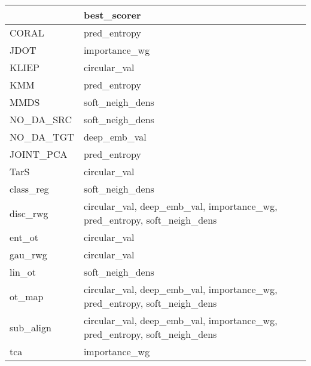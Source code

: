 \begin{tabular}{ll}
\hline
           & best\_scorer                                                              \\
\hline
 CORAL     & pred\_entropy                                                             \\
 JDOT      & importance\_wg                                                            \\
 KLIEP     & circular\_val                                                             \\
 KMM       & pred\_entropy                                                             \\
 MMDS      & soft\_neigh\_dens                                                          \\
 NO\_DA\_SRC & soft\_neigh\_dens                                                          \\
 NO\_DA\_TGT & deep\_emb\_val                                                             \\
 JOINT\_PCA & pred\_entropy                                                             \\
 TarS      & circular\_val                                                             \\
 class\_reg & soft\_neigh\_dens                                                          \\
 disc\_rwg  & circular\_val, deep\_emb\_val, importance\_wg, pred\_entropy, soft\_neigh\_dens \\
 ent\_ot    & circular\_val                                                             \\
 gau\_rwg   & circular\_val                                                             \\
 lin\_ot    & soft\_neigh\_dens                                                          \\
 ot\_map    & circular\_val, deep\_emb\_val, importance\_wg, pred\_entropy, soft\_neigh\_dens \\
 sub\_align & circular\_val, deep\_emb\_val, importance\_wg, pred\_entropy, soft\_neigh\_dens \\
 tca       & importance\_wg                                                            \\
\hline
\end{tabular}